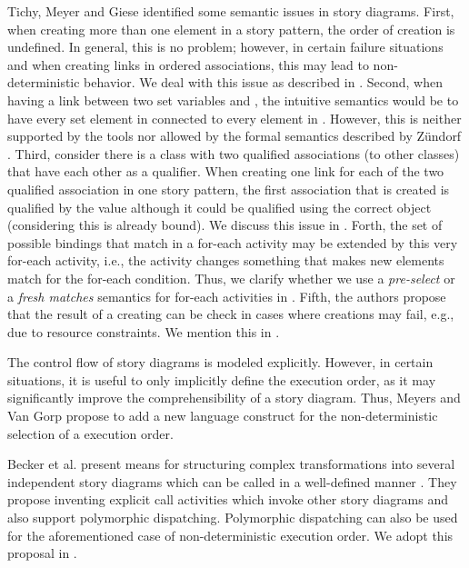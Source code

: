 Tichy, Meyer and Giese \cite{TMG06} identified some semantic issues in story diagrams.
First, when creating more than one element in a story pattern, the order of creation is undefined.
In general, this is no problem; however, in certain failure situations and when creating links in ordered associations, this may lead to non-deterministic behavior.
We deal with this issue as described in .
Second, when having a link between two set variables  and , the intuitive semantics would be to have every set element in  connected to every element in  .
However, this is neither supported by the tools nor allowed by the formal semantics described by Z\"{u}ndorf \cite{Zun01}.
Third, consider there is a class with two qualified associations (to other classes) that have each other as a qualifier.
When creating one link for each of the two qualified association in one story pattern, the first association that is created is qualified by the  value although it could be qualified using the correct object (considering this is already bound).
We discuss this issue in .
Forth, the set of possible bindings that match in a for-each activity may be extended by this very for-each activity, i.e., the activity changes something that makes new elements match for the for-each condition.
Thus, we clarify whether we use a \emph{pre-select} or a \emph{fresh matches} semantics for for-each activities in .
Fifth, the authors propose that the result of a creating can be check in cases where creations may fail, e.g., due to resource constraints.
We mention this in .

The control flow of story diagrams is modeled explicitly.
However, in certain situations, it is useful to only implicitly define the execution order, as it may significantly improve the comprehensibility of a story diagram.
Thus, Meyers and Van Gorp \cite{MG08} propose to add a new language construct for the non-deterministic selection of a execution order.

Becker et al. present means for structuring complex transformations into several independent story diagrams which can be called in a well-defined manner \cite{BvDHR11}.
They propose inventing explicit call activities which invoke other story diagrams and also support polymorphic dispatching.
Polymorphic dispatching can also be used for the aforementioned case of non-deterministic execution order.
We adopt this proposal in .

